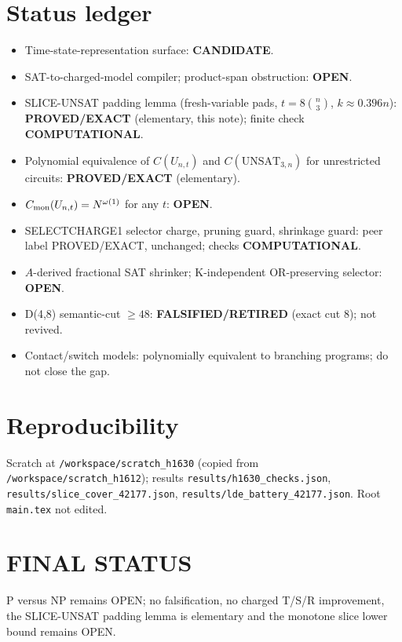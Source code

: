\documentclass[11pt]{article}
\begin{document}
\section*{Status ledger}
\begin{itemize}
\item Time-state-representation surface: \textbf{CANDIDATE}.
\item SAT-to-charged-model compiler; product-span obstruction: \textbf{OPEN}.
\item SLICE-UNSAT padding lemma (fresh-variable pads, $t=8\binom n3$, $k\approx0.396n$): \textbf{PROVED/EXACT} (elementary, this note); finite check \textbf{COMPUTATIONAL}.
\item Polynomial equivalence of $C(U_{n,t})$ and $C(\mathrm{UNSAT}_{3,n})$ for unrestricted circuits: \textbf{PROVED/EXACT} (elementary).
\item $C_{\rm mon}(U_{n,t})=N^{\omega(1)}$ for any $t$: \textbf{OPEN}.
\item SELECTCHARGE1 selector charge, pruning guard, shrinkage guard: peer label PROVED/EXACT, unchanged; checks \textbf{COMPUTATIONAL}.
\item $A$-derived fractional SAT shrinker; K-independent OR-preserving selector: \textbf{OPEN}.
\item D(4,8) semantic-cut $\ge48$: \textbf{FALSIFIED/RETIRED} (exact cut 8); not revived.
\item Contact/switch models: polynomially equivalent to branching programs; do not close the gap.
\end{itemize}

\section*{Reproducibility}
Scratch at \texttt{/workspace/scratch\_h1630} (copied from \texttt{/workspace/scratch\_h1612}); results
\texttt{results/h1630\_checks.json}, \texttt{results/slice\_cover\_42177.json}, \texttt{results/lde\_battery\_42177.json}.
Root \texttt{main.tex} not edited.

\section*{FINAL STATUS}
P versus NP remains OPEN; no falsification, no charged T/S/R improvement, the SLICE-UNSAT padding lemma is elementary
and the monotone slice lower bound remains OPEN.
\end{document}
